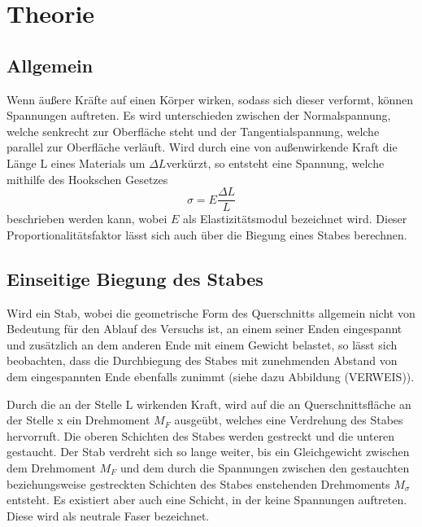 \section{Theorie}
\label{sec:Theorie}

\subsection{Allgemein}

Wenn äußere Kräfte auf einen Körper wirken, sodass 
sich dieser verformt, können Spannungen auftreten.
Es wird unterschieden zwischen der Normalspannung,
welche senkrecht zur Oberfläche steht und der 
Tangentialspannung, welche parallel zur Oberfläche 
verläuft. Wird durch eine von außenwirkende Kraft 
die Länge L eines Materials um $\Delta L $verkürzt, 
so entsteht eine Spannung, welche mithilfe
des Hookschen Gesetzes
\begin{equation}
    \sigma = E \frac{\Delta L}{L}
\end{equation}
\noindent beschrieben werden kann, wobei $E$ als
Elastizitätsmodul bezeichnet wird. Dieser 
Proportionalitätsfaktor lässt sich auch über die 
Biegung eines Stabes berechnen.


\subsection{Einseitige Biegung des Stabes}
Wird ein Stab, wobei die geometrische Form des 
Querschnitts allgemein nicht von Bedeutung für den
Ablauf des Versuchs ist, an einem seiner Enden
eingespannt und zusätzlich an dem anderen Ende mit 
einem Gewicht belastet, so lässt sich beobachten,
dass die Durchbiegung des Stabes mit zunehmenden
Abstand von dem eingespannten Ende ebenfalls 
zunimmt (siehe dazu Abbildung (VERWEIS)).

Durch die an der Stelle L wirkenden Kraft, wird auf
die an Querschnittsfläche an der Stelle x ein 
Drehmoment $M_F$ ausgeübt, welches eine Verdrehung 
des Stabes hervorruft. Die oberen Schichten des 
Stabes werden gestreckt und die unteren gestaucht. 
Der Stab verdreht sich so lange weiter, bis ein 
Gleichgewicht zwischen dem Drehmoment $M_F$
und dem durch die Spannungen zwischen den gestauchten
beziehungsweise gestreckten Schichten des Stabes 
enstehenden Drehmoments $M_{\sigma}$ entsteht.
Es existiert aber auch eine Schicht, in der keine 
Spannungen auftreten. Diese wird als neutrale
Faser bezeichnet.


